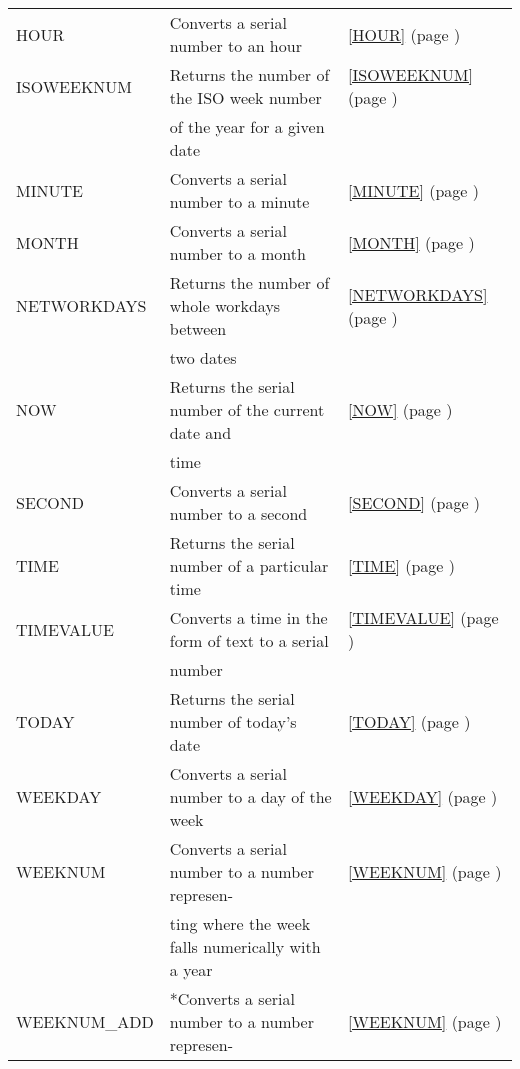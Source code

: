 \begin{center}
\begin{longtable}{l l l }
		HOUR  & Converts a serial number to an hour &  \ref{HOUR} (page \pageref{HOUR}) \index{Spreadsheet Functions!HOUR} \\
		ISOWEEKNUM & Returns the number of the ISO week number   &  \ref{ISOWEEKNUM} (page \pageref{ISOWEEKNUM}) \index{Spreadsheet Functions!ISOWEEKNUM} \\
		& of the year for a given date &  \\
		MINUTE & Converts a serial number to a minute &  \ref{MINUTE} (page \pageref{MINUTE}) \index{Spreadsheet Functions!MINUTE} \\
		MONTH & Converts a serial number to a month &  \ref{MONTH} (page \pageref{MONTH}) \index{Spreadsheet Functions!MONTH} \\
		NETWORKDAYS & Returns the number of whole workdays between  &  \ref{NETWORKDAYS} (page \pageref{NETWORKDAYS}) \index{Spreadsheet Functions!NETWORKDAYS} \\
		&  two dates &   \\		
		NOW   & Returns the serial number of the current date and  &  \ref{NOW} (page \pageref{NOW}) \index{Spreadsheet Functions!NOW} \\
		&  time &   \\				
		SECOND & Converts a serial number to a second &  \ref{SECOND} (page \pageref{SECOND}) \index{Spreadsheet Functions!SECOND} \\
		TIME  & Returns the serial number of a particular time &  \ref{TIME} (page \pageref{TIME}) \index{Spreadsheet Functions!TIME} \\
		TIMEVALUE & Converts a time in the form of text to a serial  &  \ref{TIMEVALUE} (page \pageref{TIMEVALUE}) \index{Spreadsheet Functions!TIMEVALUE} \\
		&  number &   \\				
		TODAY & Returns the serial number of today's date &  \ref{TODAY} (page \pageref{TODAY}) \index{Spreadsheet Functions!TODAY} \\
		WEEKDAY & Converts a serial number to a day of the week &  \ref{WEEKDAY} (page \pageref{WEEKDAY}) \index{Spreadsheet Functions!WEEKDAY} \\
		WEEKNUM & Converts a serial number to a number represen-  &  \ref{WEEKNUM} (page \pageref{WEEKNUM}) \index{Spreadsheet Functions!WEEKNUM} \\
		& ting where the week falls numerically with a year &   \\
		WEEKNUM\_ADD & *Converts a serial number to a number represen- &  \ref{WEEKNUM} (page \pageref{WEEKNUM}) \index{Spreadsheet Functions!WEEKNUM} \\

\end{longtable}
\end{center}
